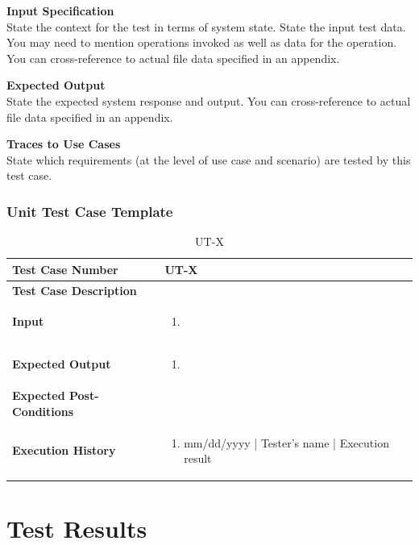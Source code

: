 \documentclass[12pt]{article}
\begin{document}
\noindent
{\bf Input Specification}\\
State the context for the test in terms of system state.
State the input test data. You may need to mention operations invoked as well as data for the operation.
You can cross-reference to actual file data specified in an appendix.

\noindent
{\bf Expected Output}\\
State the expected system response and output.
You can cross-reference to actual file data specified in an appendix.

\noindent
{\bf Traces to Use Cases}\\
State which requirements (at the level of use case and scenario) are tested by this test case.

\subsubsection{Unit Test Case Template}
\def\arraystretch{1.5}%
\begin{table}[htbp]
\centering
\caption{UT-X}
\label{UT-X}
\begin{tabularx}{\textwidth}{ | l | X |}
\hline
\textbf{Test Case Number}      		&  UT-X                   			\\ \hline
\textbf{Test Case Description}    	&                  				\\ \hline
\textbf{Input}         			& 	\begin{enumerate}
								\item
							\end{enumerate} 		\\ \hline
\textbf{Expected Output}     		& 	\begin{enumerate}
								\item 
							\end{enumerate} 		\\ \hline
\textbf{Expected Post-Conditions}	&                 				\\ \hline
\textbf{Execution History}   		&  	\begin{enumerate}
								\item mm/dd/yyyy | Tester's name | Execution result
							\end {enumerate} \\ \hline
\end{tabularx}
\end{table}
\clearpage

\section{Test Results}
\end{document}
